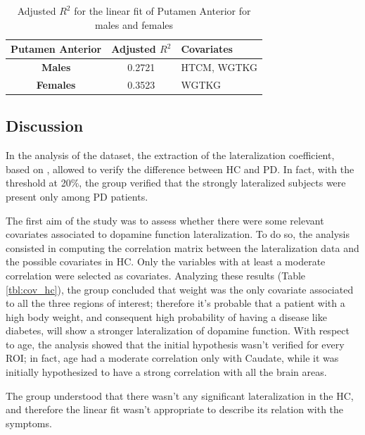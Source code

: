 \documentclass[]{article}
\begin{document}
\begin{table}[h]
	\centering
	\begin{tabular}{|c|c|l|}
		\hline
		\textbf{Putamen Anterior} & \textbf{Adjusted $R^2$} & \textbf{Covariates} \\ \hline
		\textbf{Males}            & 0.2721                  & HTCM, WGTKG         \\ \hline
		\textbf{Females}          & 0.3523                  & WGTKG               \\ \hline
	\end{tabular}
	\caption{Adjusted $R^2$ for the linear fit of Putamen Anterior for males and females}
	\label{tbl:lin_fit_put_ant}
\end{table}

\begin{multicols}{2}

\section{Discussion}

In the analysis of the dataset, the extraction of the lateralization coefficient, based on \cite{kaasinen_ipsilateral_2016}, allowed to verify the difference between HC and PD. In fact, with the threshold at 20\%, the group verified that the strongly lateralized subjects were present only among PD patients. 

The first aim of the study was to assess whether there were some relevant covariates associated to dopamine function lateralization. To do so, the analysis consisted in computing the correlation matrix between the lateralization data and the possible covariates in HC. Only the variables with at least a moderate correlation were selected as covariates. Analyzing these results (Table \ref{tbl:cov_hc}), the group concluded that weight was the only covariate associated to all the three regions of interest; therefore it's probable that a patient with a high body weight, and consequent high probability of having a disease like diabetes, will show a stronger lateralization of dopamine function. With respect to age, the analysis showed that the initial hypothesis wasn't verified for every ROI; in fact, age had a moderate correlation only with Caudate, while it was initially hypothesized to have a strong correlation with all the brain areas.

The group understood that there wasn't any significant lateralization in the HC, and therefore the linear fit wasn't appropriate to describe its relation with the symptoms.


\end{multicols}
\end{document}
